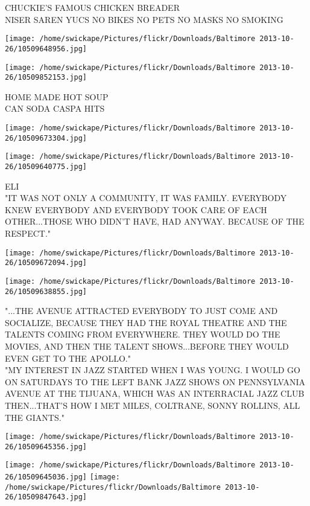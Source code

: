\documentclass[10pt,letterpaper]{article}
\begin{document}
CHUCKIE'S FAMOUS CHICKEN BREADER\\
NISER SAREN YUCS NO BIKES NO PETS NO MASKS NO SMOKING\\
\pagebreak

\texttt{[image: /home/swickape/Pictures/flickr/Downloads/Baltimore 2013-10-26/10509648956.jpg]}

\vspace{0.25in}
\texttt{[image: /home/swickape/Pictures/flickr/Downloads/Baltimore 2013-10-26/10509852153.jpg]}

HOME MADE HOT SOUP\\
CAN SODA CASPA HITS\\
\pagebreak

\texttt{[image: /home/swickape/Pictures/flickr/Downloads/Baltimore 2013-10-26/10509673304.jpg]}

\vspace{0.25in}
\texttt{[image: /home/swickape/Pictures/flickr/Downloads/Baltimore 2013-10-26/10509640775.jpg]}

ELI\\
"IT WAS NOT ONLY A COMMUNITY, IT WAS FAMILY.  EVERYBODY KNEW EVERYBODY AND EVERYBODY TOOK CARE OF EACH OTHER...THOSE WHO DIDN'T HAVE, HAD ANYWAY.  BECAUSE OF THE RESPECT."\\
\pagebreak

\texttt{[image: /home/swickape/Pictures/flickr/Downloads/Baltimore 2013-10-26/10509672094.jpg]}

\vspace{0.25in}
\texttt{[image: /home/swickape/Pictures/flickr/Downloads/Baltimore 2013-10-26/10509638855.jpg]}

"...THE AVENUE ATTRACTED EVERYBODY TO JUST COME AND SOCIALIZE, BECAUSE THEY HAD THE ROYAL THEATRE AND THE TALENTS COMING FROM EVERYWHERE.  THEY WOULD DO THE MOVIES, AND THEN THE TALENT SHOWS...BEFORE THEY WOULD EVEN GET TO THE APOLLO."\\
"MY INTEREST IN JAZZ STARTED WHEN I WAS YOUNG.  I WOULD GO ON SATURDAYS TO THE LEFT BANK JAZZ SHOWS ON PENNSYLVANIA AVENUE AT THE TIJUANA, WHICH WAS AN INTERRACIAL JAZZ CLUB THEN...THAT'S HOW I MET MILES, COLTRANE, SONNY ROLLINS, ALL THE GIANTS."\\
\pagebreak

\texttt{[image: /home/swickape/Pictures/flickr/Downloads/Baltimore 2013-10-26/10509645356.jpg]}

\vspace{0.25in}
\texttt{[image: /home/swickape/Pictures/flickr/Downloads/Baltimore 2013-10-26/10509645036.jpg]}
\texttt{[image: /home/swickape/Pictures/flickr/Downloads/Baltimore 2013-10-26/10509847643.jpg]}
\end{document}
